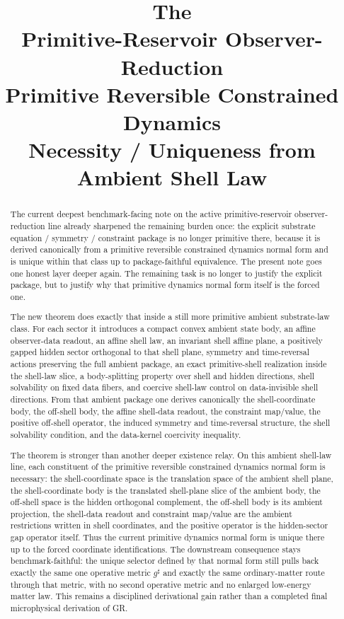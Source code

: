 \documentclass[11pt]{article}
\title{\textbf{The \TheoryName{}}\\[0.4em]
\large Primitive-Reservoir Observer-Reduction\\
\large Primitive Reversible Constrained Dynamics\\
\large Necessity / Uniqueness from Ambient Shell Law}
\author{}
\date{}
\newcommand{\CompletedMetric}{g^{\sharp}}
\begin{document}
\maketitle

\begin{abstract}
The current deepest benchmark-facing note on the active primitive-reservoir observer-reduction line already sharpened the remaining burden once: the explicit substrate equation / symmetry / constraint package is no longer primitive there, because it is derived canonically from a primitive reversible constrained dynamics normal form and is unique within that class up to package-faithful equivalence. The present note goes one honest layer deeper again. The remaining task is no longer to justify the explicit package, but to justify why that primitive dynamics normal form itself is the forced one.

The new theorem does exactly that inside a still more primitive ambient substrate-law class. For each sector it introduces a compact convex ambient state body, an affine observer-data readout, an affine shell law, an invariant shell affine plane, a positively gapped hidden sector orthogonal to that shell plane, symmetry and time-reversal actions preserving the full ambient package, an exact primitive-shell realization inside the shell-law slice, a body-splitting property over shell and hidden directions, shell solvability on fixed data fibers, and coercive shell-law control on data-invisible shell directions. From that ambient package one derives canonically the shell-coordinate body, the off-shell body, the affine shell-data readout, the constraint map/value, the positive off-shell operator, the induced symmetry and time-reversal structure, the shell solvability condition, and the data-kernel coercivity inequality.

The theorem is stronger than another deeper existence relay. On this ambient shell-law line, each constituent of the primitive reversible constrained dynamics normal form is necessary: the shell-coordinate space is the translation space of the ambient shell plane, the shell-coordinate body is the translated shell-plane slice of the ambient body, the off-shell space is the hidden orthogonal complement, the off-shell body is its ambient projection, the shell-data readout and constraint map/value are the ambient restrictions written in shell coordinates, and the positive operator is the hidden-sector gap operator itself. Thus the current primitive dynamics normal form is unique there up to the forced coordinate identifications. The downstream consequence stays benchmark-faithful: the unique selector defined by that normal form still pulls back exactly the same one operative metric \(\CompletedMetric\) and exactly the same ordinary-matter route through that metric, with no second operative metric and no enlarged low-energy matter law. This remains a disciplined derivational gain rather than a completed final microphysical derivation of GR.
\end{abstract}
\end{document}
